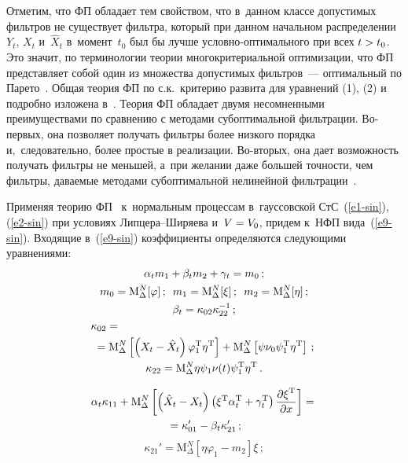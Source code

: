 \begin{multicols}{2}
Отметим, что ФП обладает тем свойством, что в~данном
классе допустимых фильтров не существует фильтра, который при
данном начальном распределении  $Y_t$, $X_t$ и~$\hat{X}_t$ в~момент~$t_0$
был бы лучше услов\-но-оп\-ти\-маль\-но\-го при всех  $t\hm>t_0$. Это
значит, по терминологии теории многокритериальной оптимизации, что
ФП представляет собой один из множества
допустимых фильтров~---  оптимальный по Парето~\cite{1-sin}.
Общая теория ФП по с.к.\ критерию развита для уравнений (1), (2)
и подробно изложена в~\cite{1-sin}.
Теория ФП
обладает двумя несомненными преимуществами по сравнению с методами
субоптимальной фильтрации. Во-пер\-вых, она позволяет
получать фильтры более низкого порядка и,~следовательно, более
простые в реализации. Во-вто\-рых, она дает возможность получать
фильтры не меньшей, а~при желании даже большей точности, чем
фильтры, даваемые методами субоптимальной нелинейной
фильтрации~\cite{1-sin, 6-sin, 8-sin}.

Применяя теорию ФП~\cite{1-sin} к~нормальным процессам в~гауссовской СтС~(\ref{e1-sin}), (\ref{e2-sin}) при условиях Лип\-це\-ра--Ши\-ря\-ева и~$V\hm=V_0$, придем к~НФП вида~(\ref{e9-sin}). Входящие в~(\ref{e9-sin}) коэффициенты определяются следующими уравнениями:
    \begin{gather}
    \alp_t m_1 + \beta_t m_2 + \gamma_t=m_0\,;\label{e10-sin}\\
   m_0 = \mathrm{M}^N_\Delta [\varphi]\,;\enskip m_1 = \mathrm{M}^N_\Delta  [\xi]\,;\enskip m_2 = \mathrm{M}^N_\Delta  [\eta]\,;\label{e11-sin}\\
\beta_t =\kappa_{02} \kappa_{22}^{-1}\,;\label{e12-sin}\\
  \kappa_{02} ={}\hspace*{63mm}\notag\\
   {}=\mathrm{M}^N_\Delta \left [\left(X_t - \hat{X}_t\right) \varphi_1^{\mathrm{T}} \eta^{\mathrm{T}}\right]+\mathrm{M}^N_\Delta \left[\psi  \nu_0\psi_1^{\mathrm{T}} \eta^{\mathrm{T}} \right]\,;\label{e12a-sin}\\
   \kappa_{22} = \mathrm{M}^N_\Delta  \eta \psi_1\nu(t) \psi_1^{\mathrm{T}} \eta^{\mathrm{T}}\,.\label{e13-sin}
   \end{gather}

\vspace*{-12pt}

   \noindent
   \begin{multline}
  \alpha_t\kappa_{11} + \mathrm{M}^N_\Delta \left[ \left(\hat{X}_t-X_t\right)\left(\xi^{\mathrm{T}} \alpha_t^{\mathrm{T}} +\gamma_t^{\mathrm{T}}\right)
\displaystyle\frac{\displaystyle \partial \xi^{\mathrm{T}}\mathstrut}{\displaystyle \partial x\mathstrut}\right]={}\\
{}=\kappa_{01}'-\beta_t\kappa_{21}'\,;\label{e14-sin}
\end{multline}
\begin{equation}
\kappa_{21}' = \mathrm{M}^N_\Delta  \left[ \eta\varphi_1-m_2\right] \xi\,;\label{e15-sin}
\end{equation}


\end{multicols}
